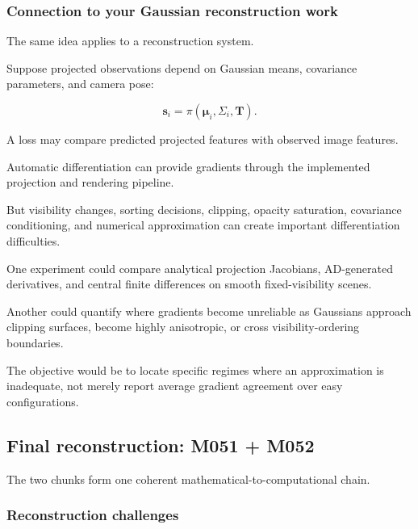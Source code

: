 \subsubsection{Connection to your Gaussian reconstruction work}\label{02-foundations-ii-ch022-connection-to-your-gaussian-reconstruction-work}

\hypertarget{02-foundations-ii-ch022-connection-to-your-gaussian-reconstruction-work}{}

The same idea applies to a reconstruction system.

Suppose projected observations depend on Gaussian means, covariance parameters, and camera pose:

\[
\mathbf s_i= \pi(\boldsymbol\mu_i,\Sigma_i,\mathbf T).
\]

A loss may compare predicted projected features with observed image features.

Automatic differentiation can provide gradients through the implemented projection and rendering pipeline.

But visibility changes, sorting decisions, clipping, opacity saturation, covariance conditioning, and numerical approximation can create important differentiation difficulties.

One experiment could compare analytical projection Jacobians, AD-generated derivatives, and central finite differences on smooth fixed-visibility scenes.

Another could quantify where gradients become unreliable as Gaussians approach clipping surfaces, become highly anisotropic, or cross visibility-ordering boundaries.

The objective would be to locate specific regimes where an approximation is inadequate, not merely report average gradient agreement over easy configurations.

\subsection{Final reconstruction: M051 + M052}\label{02-foundations-ii-ch022-final-reconstruction-m051-m052}

\hypertarget{02-foundations-ii-ch022-final-reconstruction-m051-m052}{}

The two chunks form one coherent mathematical-to-computational chain.

\subsubsection{Reconstruction challenges}\label{02-foundations-ii-ch022-reconstruction-challenges}

